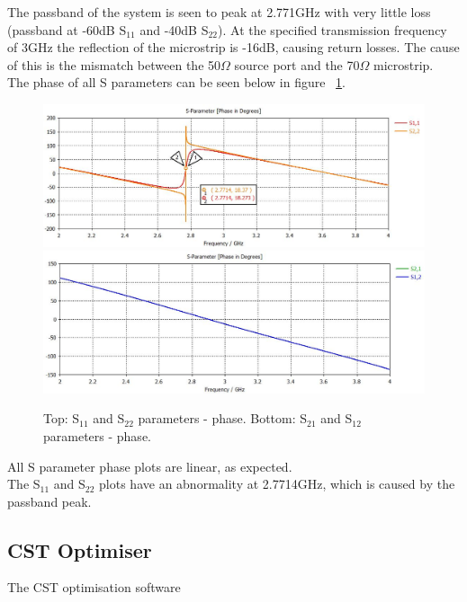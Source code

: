 \documentclass{paper}
\begin{document}
The passband of the system is seen to peak at 2.771GHz with very little loss (passband at -60dB S$_{11}$ and -40dB S$_{22}$). At the specified transmission frequency of 3GHz the reflection of the microstrip is -16dB, causing return losses. The cause of this is the mismatch between the 50$\Omega$ source port and the 70$\Omega$ microstrip.\\

The phase of all S parameters can be seen below in figure ~\ref{fig:s11_s22_s21_s12_phase}.\\

\begin{figure}[H]
	\centering
	\includegraphics[scale=0.4]{IMG/S11_and_S22_phase}
	\includegraphics[scale=0.4]{IMG/S21_and_S12_phase}
	\caption{Top: S$_{11}$ and S$_{22}$ parameters - phase. Bottom: S$_{21}$ and S$_{12}$ parameters - phase.}
	\label{fig:s11_s22_s21_s12_phase}
\end{figure}

All S parameter phase plots are linear, as expected. \\

The S$_{11}$ and S$_{22}$ plots have an abnormality at 2.7714GHz, which is caused by the passband peak.\\

\subsection{CST Optimiser}
The CST optimisation software 
\end{document}
